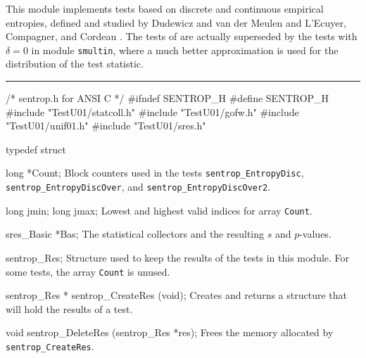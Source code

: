
This module implements tests based on discrete and continuous
empirical entropies, defined and studied by
Dudewicz and van der Meulen  \cite{rDUD81b,rDUD95a}
and L'Ecuyer, Compagner, and Cordeau \cite{rLEC96e}.
The tests of \cite{rDUD81b,rDUD95a} are actually superseded by the
tests with $\delta=0$ in module {\tt smultin}, where a much better
approximation is used for the distribution of the test statistic.
 \resdef


\bigskip\hrule
\code\hide
/* sentrop.h  for ANSI C */
#ifndef SENTROP_H
#define SENTROP_H
\endhide
#include "TestU01/statcoll.h"
#include "TestU01/gofw.h"
#include "TestU01/unif01.h"
#include "TestU01/sres.h"
\endcode


\ifdetailed  %

\code

typedef struct {

   long *Count;
\endcode
\tabb
   Block counters used in the tests  {\tt sentrop\_EntropyDisc},
  {\tt sentrop\_EntropyDiscOver}, and {\tt sentrop\_EntropyDiscOver2}.
\endtabb
\code

   long jmin;
   long jmax;
\endcode
\tabb
  Lowest and highest valid indices for array {\tt Count}.
\endtabb
\code

   sres_Basic *Bas;
\endcode
 \tabb
  The statistical collectors and the resulting $s$ and $p$-values.
 \endtabb
\code

} sentrop_Res;
\endcode
 \tab
  Structure used to keep the results of the tests in this module.
  For some tests, the array {\tt Count} is unused.
 \endtab
\code


sentrop_Res * sentrop_CreateRes (void);
\endcode
 \tab
  Creates and returns a structure that will hold the results of a test.
 \endtab
\code


void sentrop_DeleteRes (sentrop_Res *res);
\endcode
 \tab
  Frees the memory allocated by {\tt sentrop\_CreateRes}.
 \endtab
\fi   %



\code

